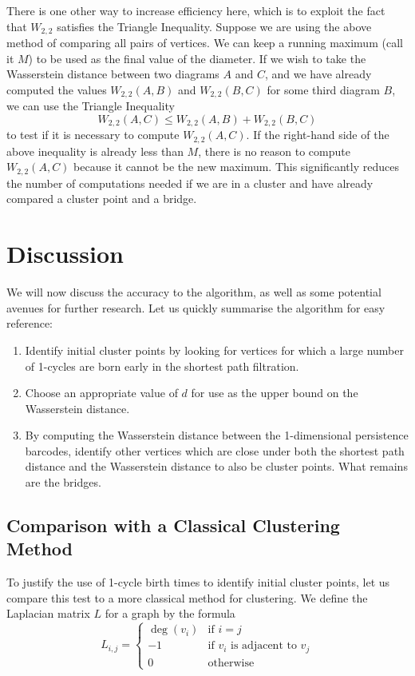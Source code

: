 \documentclass[12pt,a4paper]{amsart}
\numberwithin{equation}{section}
\theoremstyle{plain}
\theoremstyle{definition}
\begin{document}
There is one other way to increase efficiency here, which is to exploit the fact that $W_{2,2}$ satisfies the Triangle Inequality. Suppose we are using the above method of comparing all pairs of vertices. We can keep a running maximum (call it $M$) to be used as the final value of the diameter. If we wish to take the Wasserstein distance between two diagrams $A$ and $C$, and we have already computed the values $W_{2,2}(A,B)$ and $W_{2,2}(B,C)$ for some third diagram $B$, we can use the Triangle Inequality
\[ W_{2,2}(A,C) \leq W_{2,2}(A,B) + W_{2,2}(B,C) \]
to test if it is necessary to compute $W_{2,2}(A,C)$. If the right-hand side of the above inequality is already less than $M$, there is no reason to compute $W_{2,2}(A,C)$ because it cannot be the new maximum. This significantly reduces the number of computations needed if we are in a cluster and have already compared a cluster point and a bridge.


\section{Discussion}

We will now discuss the accuracy to the algorithm, as well as some potential avenues for further research. Let us quickly summarise the algorithm for easy reference:
\begin{enumerate}
	\item Identify initial cluster points by looking for vertices for which a large number of 1-cycles are born early in the shortest path filtration.
	\item Choose an appropriate value of $d$ for use as the upper bound on the Wasserstein distance.
	\item By computing the Wasserstein distance between the 1-dimensional persistence barcodes, identify other vertices which are close under both the shortest path distance and the Wasserstein distance to also be cluster points. What remains are the bridges.
\end{enumerate}

\newpage

\subsection{Comparison with a Classical Clustering Method} To justify the use of 1-cycle birth times to identify initial cluster points, let us compare this test to a more classical method for clustering. We define the Laplacian matrix $L$ for a graph by the formula
\[ L_{i,j} = \begin{cases} \deg(v_i) & \mbox{if $i=j$} \\ -1 & \mbox{if $v_i$ is adjacent to $v_j$} \\ 0 & \mbox{otherwise} \end{cases} \]
\end{document}
